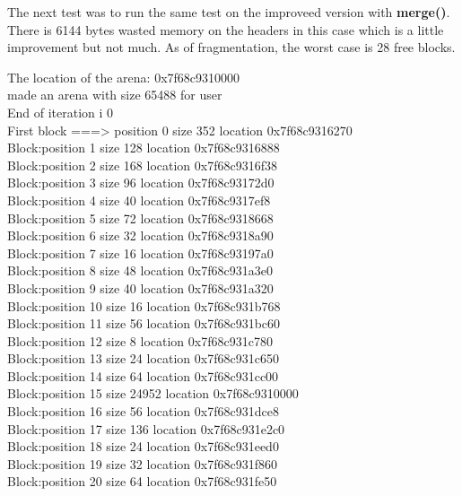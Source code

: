\documentclass[a4paper,10pt]{article}
\begin{document}
The next test was to run the same test on the improveed version with \textbf{merge()}. There is 6144 bytes wasted memory on the headers in this case which is a little improvement but not much. As of fragmentation, the worst case is 28 free blocks.

\vspace{5mm}

The location of the arena: 0x7f68c9310000\\
made an arena with size 65488 for user\\
End of iteration i 0\\
First block ===> position 0 size 352 location 0x7f68c9316270\\
   Block:position 1 size 128 location 0x7f68c9316888\\
   Block:position 2 size 168 location 0x7f68c9316f38\\
   Block:position 3 size 96 location 0x7f68c93172d0\\
   Block:position 4 size 40 location 0x7f68c9317ef8\\
   Block:position 5 size 72 location 0x7f68c9318668\\
   Block:position 6 size 32 location 0x7f68c9318a90\\
   Block:position 7 size 16 location 0x7f68c93197a0\\
   Block:position 8 size 48 location 0x7f68c931a3e0\\
   Block:position 9 size 40 location 0x7f68c931a320\\
   Block:position 10 size 16 location 0x7f68c931b768\\
   Block:position 11 size 56 location 0x7f68c931bc60\\
   Block:position 12 size 8 location 0x7f68c931c780\\
   Block:position 13 size 24 location 0x7f68c931c650\\
   Block:position 14 size 64 location 0x7f68c931cc00\\
   Block:position 15 size 24952 location 0x7f68c9310000\\
   Block:position 16 size 56 location 0x7f68c931dce8\\
   Block:position 17 size 136 location 0x7f68c931e2c0\\
   Block:position 18 size 24 location 0x7f68c931eed0\\
   Block:position 19 size 32 location 0x7f68c931f860\\
   Block:position 20 size 64 location 0x7f68c931fe50\\
\end{document}
